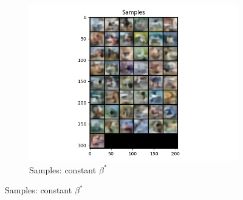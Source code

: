 \documentclass[11pt,addpoints,answers]{exam}
\numberwithin{equation}{section} %
\numberwithin{figure}{section} %
\numberwithin{table}{section} %
\begin{document}
\begin{questions}
\begin{figure}[H]
\begin{subfigure}[b]{0.32\linewidth}
    \includegraphics[width=\linewidth]{2.2c.png}
    \caption{Samples: constant $\beta^*$}
    \end{subfigure}
    

\end{figure}
\end{questions}
\end{document}
